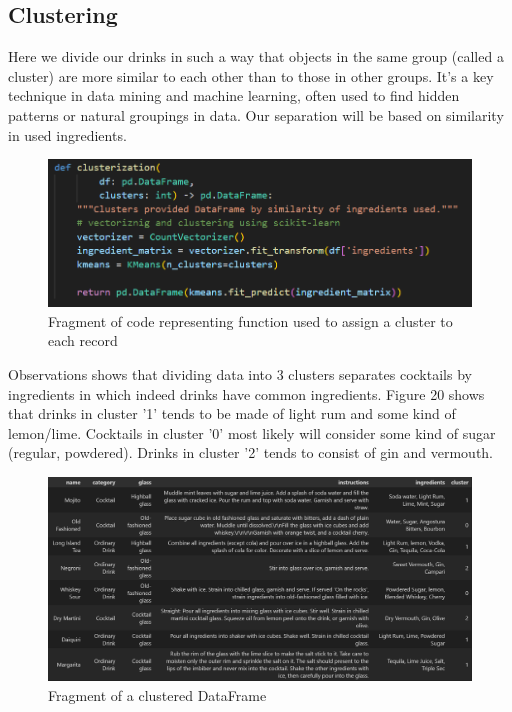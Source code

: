 \documentclass[a4paper]{article}
\begin{document}
\subsection{Clustering}
Here we divide our drinks in such a way that objects in the same group (called a cluster) are more similar to each other than to those in other groups. It's a key technique in data mining and machine learning, often used to find hidden patterns or natural groupings in data. Our separation will be based on similarity in used ingredients.

\begin{figure}[H]
    \centering
    \includegraphics[width=0.9\linewidth]{clusterization.png}
    \caption{Fragment of code representing function used to assign a cluster to each record}
    \label{fig:enter-label}
\end{figure}

Observations shows that dividing data into 3 clusters separates cocktails by ingredients in which indeed drinks have common ingredients. Figure 20 shows that drinks in cluster '1' tends to be made of light rum and some kind of lemon/lime. Cocktails in cluster '0' most likely will consider some kind of sugar (regular, powdered). Drinks in cluster '2' tends to consist of gin and vermouth.

\begin{figure}[H]
    \centering
    \includegraphics[width=1\linewidth]{clustered head.png}
    \caption{Fragment of a clustered DataFrame}
    \label{fig:enter-label}
\end{figure}
\end{document}
